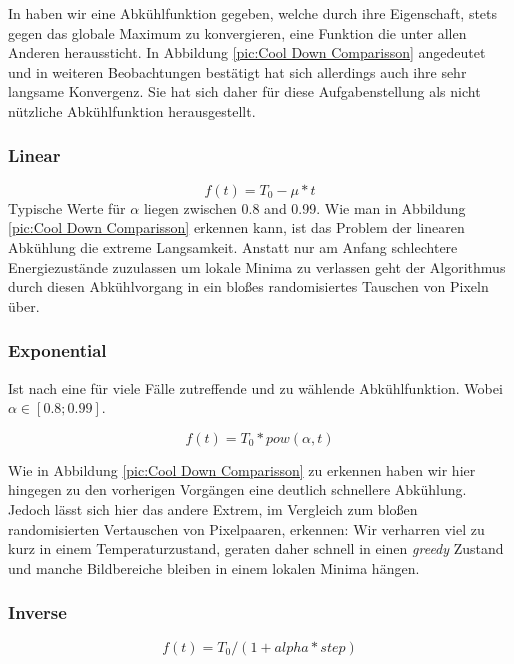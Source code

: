 In \cite{hajek1988cooling} haben wir eine Abkühlfunktion gegeben, welche durch ihre Eigenschaft,
stets gegen das globale Maximum zu konvergieren, eine Funktion die unter allen Anderen heraussticht.
In Abbildung \ref{pic:Cool Down Comparisson} angedeutet und in weiteren Beobachtungen bestätigt hat sich 
allerdings auch ihre sehr langsame Konvergenz.
Sie hat sich daher für diese Aufgabenstellung als nicht nützliche Abkühlfunktion herausgestellt.

\subsubsection{Linear}

\begin{equation}\label{eq:lineare Abkühlung}
    f(t) = T_0 - \mu*t
\end{equation}
Typische Werte für $\alpha$ liegen zwischen 0.8 and 0.99. Wie man in Abbildung \ref{pic:Cool Down Comparisson}
erkennen kann, ist das Problem der linearen Abkühlung die extreme Langsamkeit.
Anstatt nur am Anfang schlechtere Energiezustände zuzulassen um lokale Minima zu verlassen 
geht der Algorithmus durch diesen Abkühlvorgang in ein bloßes randomisiertes Tauschen von Pixeln über.

\subsubsection{Exponential}
Ist nach \cite{Kirkpatrick671} eine für viele Fälle zutreffende und zu wählende Abkühlfunktion.
Wobei $\alpha \in [0.8; 0.99]$.

\begin{equation}\label{eq:Exponential}
    f(t) = T_0*pow(\alpha,t)
\end{equation}

Wie in Abbildung \ref{pic:Cool Down Comparisson} zu erkennen haben wir hier hingegen zu den vorherigen Vorgängen
eine deutlich schnellere Abkühlung. Jedoch lässt sich hier das andere Extrem, im Vergleich zum bloßen randomisierten
Vertauschen von Pixelpaaren, erkennen: Wir verharren viel zu kurz in einem Temperaturzustand, geraten daher schnell 
in einen \textit{greedy} Zustand und manche Bildbereiche bleiben in einem lokalen Minima hängen.

\subsubsection{Inverse}

\begin{equation}\label{eq:Inverse}
    f(t) = T_0 / (1 + alpha * step)
\end{equation}

